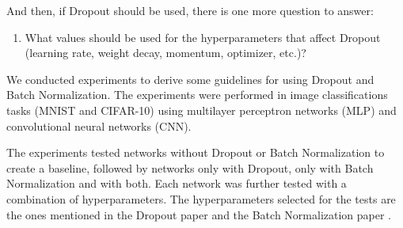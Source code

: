 \documentclass[../CAP6619_term_project_cgarbin.tex]{subfiles}
\begin{document}
And then, if Dropout should be used, there is one more question to answer:

\begin{enumerate}
\item What values should be used for the hyperparameters that affect Dropout (learning rate, weight decay, momentum, optimizer, etc.)?
\end{enumerate}

We conducted experiments to derive some guidelines for using Dropout and Batch Normalization. The experiments were performed in image classifications tasks (MNIST and CIFAR-10) using multilayer perceptron networks (MLP) and convolutional neural networks (CNN).

The experiments tested networks without Dropout or Batch Normalization to create a baseline, followed by networks only with Dropout, only with Batch Normalization and with both. Each network was further tested with a combination of hyperparameters. The hyperparameters selected for the tests are the ones mentioned in the Dropout paper \cite{Srivastava2014} and the Batch Normalization paper \cite{Ioffe2015}.
\end{document}
